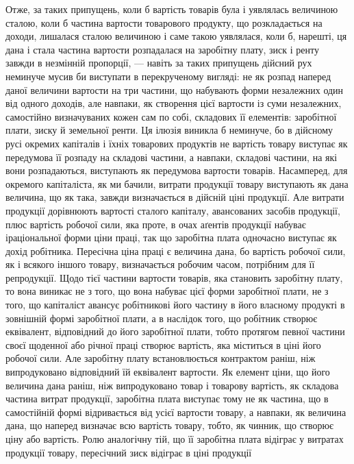 
Отже, за таких припущень, коли б вартість товарів була і уявлялась величиною
сталою, коли б частина вартости товарового продукту, що розкладається
на доходи, лишалася сталою величиною і саме такою уявлялася, коли б, нарешті,
ця дана і стала частина вартости розпадалася на заробітну плату, зиск і ренту
завжди в незмінній пропорції, — навіть за таких припущень дійсний рух неминуче
мусив би виступати в перекрученому вигляді: не як розпад наперед даної
величини вартости на три частини, що набувають форми незалежних один від
одного доходів, але навпаки, як створення цієї вартости із суми незалежних,
самостійно визначуваних кожен сам по собі, складових її елементів: заробітної
плати, зиску й земельної ренти. Ця ілюзія виникла б неминуче, бо в дійсному
русі окремих капіталів і їхніх товарових продуктів не вартість товару виступає
як передумова її розпаду на складові частини, а навпаки, складові частини, на які
вони розпадаються, виступають як передумова вартости товарів. Насамперед, для
окремого капіталіста, як ми бачили, витрати продукції товару виступають
як дана величина, що як така, завжди визначається в дійсній ціні продукції.
Але витрати продукції дорівнюють вартості сталого капіталу, авансованих засобів
продукції, плюс вартість робочої сили, яка проте, в очах аґентів продукції набуває
іраціональної форми ціни праці, так що заробітна плата одночасно виступає
як дохід робітника. Пересічна ціна праці є величина дана, бо вартість робочої
сили, як і всякого іншого товару, визначається робочим часом, потрібним
для її репродукції. Щодо тієї частини вартости товарів, яка становить заробітну
плату, то вона виникає не з того, що вона набуває цієї форми заробітної плати,
не з того, що капіталіст авансує робітникові його частину в його власному
продукті в зовнішній формі заробітної плати, а в наслідок того, що робітник
створює еквівалент, відповідний до його заробітної плати, тобто протягом певної
частини своєї щоденної або річної праці створює вартість, яка міститься в ціні
його робочої сили. Але заробітну плату встановлюється контрактом раніш, ніж
випродуковано відповідний їй еквівалент вартости. Як елемент ціни, що його
величина дана раніш, ніж випродуковано товар і товарову вартість, як складова
частина витрат продукції, заробітна плата виступає тому не як частина,
що в самостійній формі відривається від усієї вартости товару, а навпаки, як
величина дана, що наперед визначає всю вартість товару, тобто, як чинник,
що створює ціну або вартість. Ролю аналогічну тій, що її заробітна плата
відіграє у витратах продукції товару, пересічний зиск відіграє в ціні продукції
